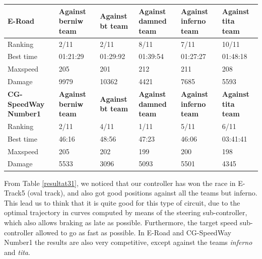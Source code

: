 \documentclass[runningheads,a4paper]{llncs}
\begin{document}
\begin{table}[ht!]
{\begin{tabular}{ |p{2cm}|p{2cm}|p{2cm}|p{2 cm}|p{2 cm}|p{2 cm}|}
				
				{ \color{blue}\textbf{E-Road} }&
				{ \color{red}\textbf{Against berniw team }}&  
				{ \color{red} \textbf{Against bt team} } &
				{ \color{red} \textbf{Against damned team} } &
				{ \color{red} \textbf{Against inferno team} }&
				{ \color{red} \textbf{Against tita team} }
				\\
				\hline
				Ranking & 2/11 & 2/11 & 8/11 & 7/11 & 10/11
				\\
				\hline 
				Best time& 01:21:29  & 01:29:92 & 01:39:54 & 01:27:27   & 01:48:18
				\\
				\hline 
				Maxspeed & 205 & 201 & 212 & 211 & 208
				\\
				\hline
				
				Damage & 9979 & 10362 & 4421 & 7685 & 5593
				\\
				
				\hline 
				\hline
				{ \color{blue}\textbf{CG-SpeedWay Number1} }&
				{ \color{red}\textbf{Against berniw team }}&  
				{ \color{red} \textbf{Against bt team} } &
				{ \color{red} \textbf{Against damned team} } &
				{ \color{red} \textbf{Against inferno team} }&
				{ \color{red} \textbf{Against tita team} }
				\\
				\hline
				Ranking & 2/11  & 4/11  & 1/11  & 5/11& 6/11
				\\
				\hline
				Best time & 46:16   & 48:56 & 47:23 & 46:06& 03:41:41
				\\
				\hline 
				Maxspeed & 205 & 202 & 199 & 200 & 198
				\\
				\hline		
				Damage &5533 & 3096 & 5093 & 5501& 4345		\\
				\hline 
				
				
			\end{tabular} 
		}
	\end{table}
	
	From Table \ref {resultat31}, we noticed that our controller has won the race in E-Track5 (oval track), and also got good positions against all the teams but inferno. This lead us to think that it is quite good for this type of circuit, due to the optimal trajectory in curves computed by means of the steering sub-controller, which also allows braking as late as possible.
	Furthermore, the target speed sub-controller allowed to go as fast as possible. In E-Road and CG-SpeedWay Number1 the results are also very competitive, except against the teams {\em inferno} and {\em tita}.
	
\end{document}
